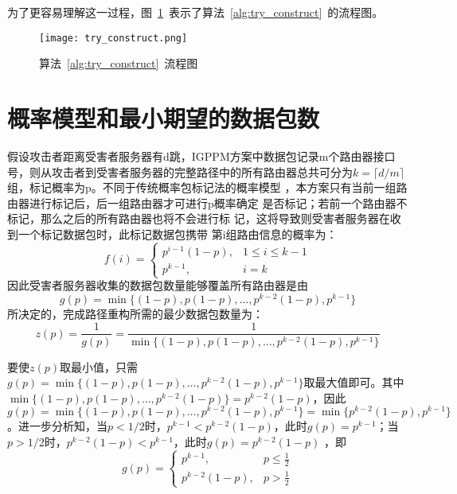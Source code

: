 

为了更容易理解这一过程，图~\ref*{fig:try_construct}~表示了算法~\ref*{alg:try_construct}~的流程图。
\begin{figure}[htbp]
  \centering
  \texttt{[image: try\_construct.png]}
  \caption{算法~\ref*{alg:try_construct}~流程图}
  \label{fig:try_construct}
\end{figure} 

\section{概率模型和最小期望的数据包数}
\label{sec:mainbody} 
假设攻击者距离受害者服务器有d跳，IGPPM方案中数据包记录m个路由器接口
号，则从攻击者到受害者服务器的完整路径中的所有路由器总共可分为$k = 
\lceil d/m \rceil$组，标记概率为p。不同于传统概率包标记法的概率模型
，本方案只有当前一组路由器进行标记后，后一组路由器才可进行p概率确定
是否标记；若前一个路由器不标记，那么之后的所有路由器也将不会进行标
记，这将导致则受害者服务器在收到一个标记数据包时，此标记数据包携带
第i组路由信息的概率为：
\begin{equation}
  \label{eq:Probability of i-th Router}
  f(i) = 
  \begin{cases} 
    p^{i-1}(1-p), & 1 \leq i \leq k-1 \\
    p^{k-1}, & i = k 
  \end{cases}
\end{equation}
因此受害者服务器收集的数据包数量能够覆盖所有路由器是由
\begin{equation}
  \label{eq:Path Coverage Probability}
  g(p) = \min\{(1 - p), p(1 - p), \ldots, p^{k-2}(1 - p), p^{k-1}\}
\end{equation}
所决定的，完成路径重构所需的最少数据包数量为：
\begin{equation}
  \label{eq:Minimum Packets for Path Reconstruction}
  z(p) = \frac{1}{g(p)} = \frac{1}{\min\{(1 - p), p(1 - p), \ldots, p^{k-2}(1 - p), p^{k-1}\}}
\end{equation}


要使$z(p)$取最小值，只需$g(p) = \min\{(1 - p), p(1 - p), \ldots, p^{k-2}(1 - p), p^{k-1}\}
$取最大值即可。其中$\min\{(1 - p), p(1 - p), \ldots, p^{k-2}(1 - p)\} = p^{k-2}(1 - p)$，因此$g(p) = \min\{(1 - p), p(1 - p), \ldots, p^{k-2}(1 - p), p^{k-1}\}
 = \min\{p^{k-2}(1 - p), p^{k-1}\}$。进一步分析知，当$p<1/2$时，$p^{k-1}<p^{k-2}(1 - p)$，此时$g(p) = p^{k-1}$；当$p>1/2$时，$p^{k-2}(1 - p)<p^{k-1}$，此时$g(p) = p^{k-2}(1 - p)$
，即
\begin{equation}
  \label{eq:Simplified Probability of i-th Router}
  g(p) = 
  \begin{cases} 
    p^{k-1}, & p \leq \frac{1}{2} \\
    p^{k-2}(1 - p), & p > \frac{1}{2}
  \end{cases}
\end{equation}

